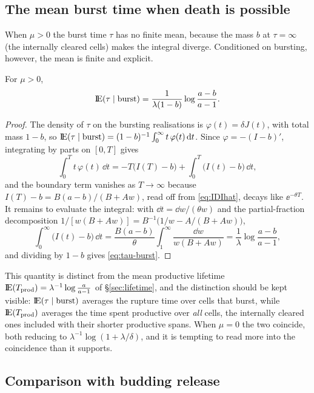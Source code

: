 \subsection{The mean burst time when death is possible}
\label{sec:tau-burst-mu-pos}

When $\mu>0$ the burst time $\tau$ has no finite mean, because the mass $b$
at $\tau=\infty$ (the internally cleared cells) makes the integral diverge.
Conditioned on bursting, however, the mean is finite and explicit.

\begin{proposition}
\label{prop:tau-burst}
For $\mu>0$,
\begin{equation}
{\rm I}\!{\rm E}(\tau\mid\text{burst})
=\frac{1}{\lambda(1-b)}\log\frac{a-b}{a-1}.
\label{eq:tau-burst}
\end{equation}
\end{proposition}

\begin{proof}
The density of $\tau$ on the bursting realisations is $\varphi(t)=\delta J(t)$,
with total mass $1-b$, so
${\rm I}\!{\rm E}(\tau\mid\text{burst})=(1-b)^{-1}\int_0^\infty t\,\varphi(t)\,{\rm d} t$.
Since $\varphi=-(I-b)'$, integrating by parts on $[0,T]$ gives
$$\int_0^T t\,\varphi(t)\,\dd t
=-T\bigl(I(T)-b\bigr)+\int_0^T\bigl(I(t)-b\bigr)\,\dd t,$$
and the boundary term vanishes as $T\to\infty$ because
$I(T)-b=B(a-b)/(B+Aw)$, read off from \eqref{eq:IDIhat}, decays like
$\ee^{-\theta T}$. It remains to evaluate the integral: with
$\dd t=\dd w/(\theta w)$ and the partial-fraction decomposition
$1/[w(B+Aw)]=B^{-1}\bigl(1/w-A/(B+Aw)\bigr)$,
$$\int_0^\infty\bigl(I(t)-b\bigr)\,\dd t
=\frac{B(a-b)}{\theta}\int_1^\infty\frac{\dd w}{w(B+Aw)}
=\frac{1}{\lambda}\log\frac{a-b}{a-1},$$
and dividing by $1-b$ gives \eqref{eq:tau-burst}.
\end{proof}

This quantity is distinct from the mean productive lifetime
${\rm I}\!{\rm E}(T_{\rm prod})=\lambda^{-1}\log\frac{a}{a-1}$ of
\S\ref{sec:lifetime}, and the distinction should be kept visible:
${\rm I}\!{\rm E}(\tau\mid\text{burst})$ averages the rupture time over cells that
burst, while ${\rm I}\!{\rm E}(T_{\rm prod})$ averages the time spent productive over
\textit{all} cells, the internally cleared ones included with their shorter
productive spans. When $\mu=0$ the two coincide, both reducing to
$\lambda^{-1}\log(1+\lambda/\delta)$, and it is tempting to read more into
the coincidence than it supports.

\subsection{Comparison with budding release}
\label{sec:bud-vs-burst-single-cell}

